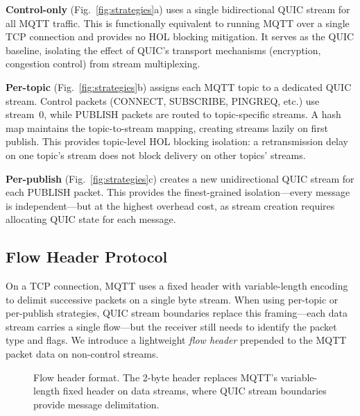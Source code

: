 \textbf{Control-only} (Fig.~\ref{fig:strategies}a) uses a single bidirectional QUIC stream for all MQTT traffic. This is functionally equivalent to running MQTT over a single TCP connection and provides no HOL blocking mitigation. It serves as the QUIC baseline, isolating the effect of QUIC's transport mechanisms (encryption, congestion control) from stream multiplexing.

\textbf{Per-topic} (Fig.~\ref{fig:strategies}b) assigns each MQTT topic to a dedicated QUIC stream. Control packets (CONNECT, SUBSCRIBE, PINGREQ, etc.) use stream~0, while PUBLISH packets are routed to topic-specific streams. A hash map maintains the topic-to-stream mapping, creating streams lazily on first publish. This provides topic-level HOL blocking isolation: a retransmission delay on one topic's stream does not block delivery on other topics' streams.

\textbf{Per-publish} (Fig.~\ref{fig:strategies}c) creates a new unidirectional QUIC stream for each PUBLISH packet. This provides the finest-grained isolation---every message is independent---but at the highest overhead cost, as stream creation requires allocating QUIC state for each message.

\subsection{Flow Header Protocol}

On a TCP connection, MQTT uses a fixed header with variable-length encoding to delimit successive packets on a single byte stream. When using per-topic or per-publish strategies, QUIC stream boundaries replace this framing---each data stream carries a single flow---but the receiver still needs to identify the packet type and flags. We introduce a lightweight \emph{flow header} prepended to the MQTT packet data on non-control streams.

\begin{figure}[htbp]
\centering
{}
\caption{Flow header format. The 2-byte header replaces MQTT's variable-length fixed header on data streams, where QUIC stream boundaries provide message delimitation.}
\label{fig:flow-header}
\end{figure}

